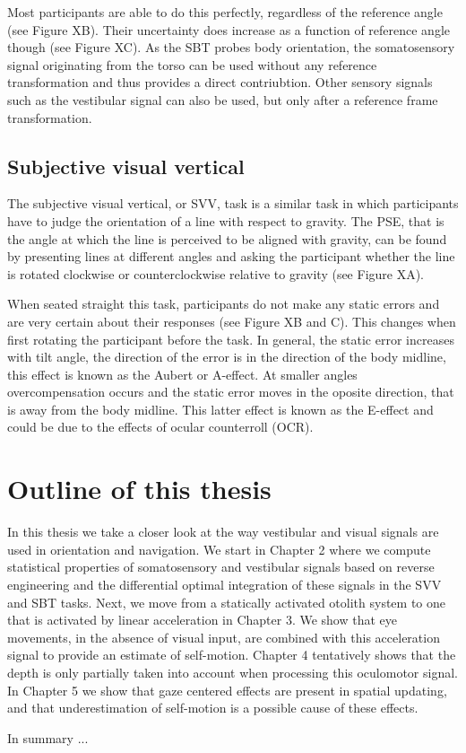 Most participants are able to do this perfectly, regardless of the reference angle (see Figure XB). Their uncertainty does increase as a function of reference angle though (see Figure XC).
As the SBT probes body orientation, the somatosensory signal originating from the torso can be used without any reference transformation and thus provides a direct contriubtion. Other sensory signals such as the vestibular signal can also be used, but only after a reference frame transformation.

\subsection{Subjective visual vertical}
The subjective visual vertical, or SVV, task is a similar task in which participants have to judge the orientation of a line with respect to gravity. The PSE, that is the angle at which the line is perceived to be aligned with gravity, can be found by presenting lines at different angles and asking the participant whether the line is rotated clockwise or counterclockwise relative to gravity (see Figure XA).

When seated straight this task, participants do not make any static errors and are very certain about their responses (see Figure XB and C). This changes when first rotating the participant before the task. In general, the static error increases with tilt angle, the direction of the error is in the direction of the body midline, this effect is known as the Aubert or A-effect. At smaller angles overcompensation occurs and the static error moves in the oposite direction, that is away from the body midline. This latter effect is known as the E-effect and could be due to the effects of ocular counterroll (OCR).


\section{Outline of this thesis}
In this thesis we take a closer look at the way vestibular and visual signals are used in orientation and navigation. We start in Chapter 2 where we compute statistical properties of somatosensory and vestibular signals based on reverse engineering and the differential optimal integration of these signals in the SVV and SBT tasks. Next, we move from a statically activated otolith system to one that is activated by linear acceleration in Chapter 3. We show that eye movements, in the absence of visual input, are combined with this acceleration signal to provide an estimate of self-motion. Chapter 4 tentatively shows that the depth is only partially taken into account when processing this oculomotor signal. In Chapter 5 we show that gaze centered effects are present in spatial updating, and that underestimation of self-motion is a possible cause of these effects.

In summary ...
